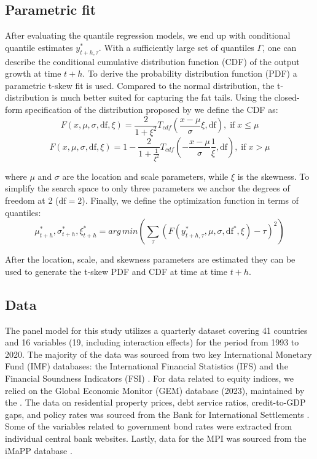 \subsection{Parametric fit}
After evaluating the quantile regression models, we end up with conditional quantile estimates $y_{t+h, \tau}^*$. With a sufficiently large set of quantiles $\Gamma$, one can describe the conditional cumulative distribution function (CDF) of the output growth at time $t+h$. To derive the probability distribution function (PDF) a parametric t-skew fit \citep{adrian_2019} is used. Compared to the normal distribution, the t-distribution is much better suited for capturing the fat tails. Using the closed-form specification of the distribution proposed by \citet{giot2003} we define the CDF as:
\begin{equation}
    \label{eq:tskew_cdf_n}
    F(x, \mu, \sigma, \text{df}, \xi) = \frac{2}{1+\xi^2} T_{cdf}\left(\frac{x-\mu}{\sigma}\xi, \text{df}\right), \;\text{if}\; x \leq \mu 
\end{equation}
\begin{equation}
    \label{eq:tskew_cdf_p}
    F(x, \mu, \sigma, \text{df}, \xi) = 1 - \frac{2}{1+\frac{1}{\xi^2}} T_{cdf}\left(-\frac{x-\mu}{\sigma}\frac{1}{\xi}, \text{df}\right), \;\text{if}\; x > \mu 
\end{equation}

where $\mu$ and $\sigma$ are the location and scale parameters, while $\xi$ is the skewness. To simplify the search space to only three parameters we anchor the degrees of freedom at 2 ($\text{df}=2$). Finally, we define the optimization function in terms of quantiles:
\begin{equation}
    \label{eq:tskew_cdf_loss}
    \mu_{t+h}^*, \sigma_{t+h}^*, \xi_{t+h}^* = arg\,min\left(\sum_\tau \left(F(y_{t+h, \tau}^*, \mu, \sigma, \text{df}^*, \xi)-\tau\right)^2\right)
\end{equation}

After the location, scale, and skewness parameters are estimated they can be used to generate the t-skew PDF and CDF at time at time $t+h$.

\subsection{Data}
The panel model for this study utilizes a quarterly dataset covering 41 countries and 16 variables (19, including interaction effects) for the period from 1993 to 2020. The majority of the data was sourced from two key International Monetary Fund (IMF) databases: the International Financial Statistics (IFS) and the Financial Soundness Indicators (FSI) \citep{ifs2024, fsi2024}. For data related to equity indices, we relied on the Global Economic Monitor (GEM) database (2023), maintained by the \citet{gem2024}. The data on residential property prices, debt service ratios, credit-to-GDP gaps, and policy rates was sourced from the Bank for International Settlements \citep{RPP, DSR, CREDIT_GAPS, CBPOL}. Some of the variables related to government bond rates were extracted from individual central bank websites. Lastly, data for the MPI was sourced from the iMaPP database \citep{alam2019}.

